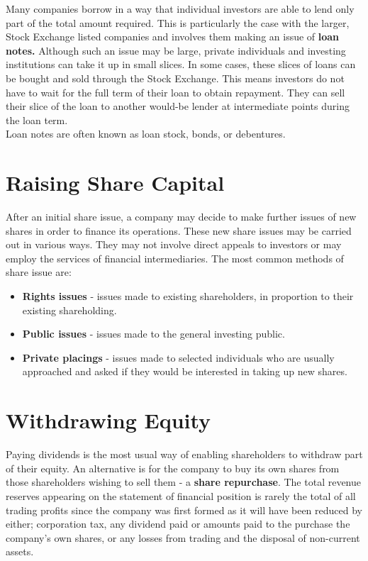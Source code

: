 \documentclass{report}
\begin{document}
Many companies borrow in a way that individual investors are able to lend only part of the total amount required. This is particularly the case with the larger, Stock Exchange listed companies and involves them making an issue of \textbf{loan notes.} Although such an issue may be large, private individuals and investing institutions can take it up in small slices. In some cases, these slices of loans can be bought and sold through the Stock Exchange. This means investors do not have to wait for the full term of their loan to obtain repayment. They can sell their slice of the loan to another would-be lender at intermediate points during the loan term.\\

Loan notes are often known as loan stock, bonds, or debentures.

\section{Raising Share Capital}

After an initial share issue, a company may decide to make further issues of new shares in order to finance its operations. These new share issues may be carried out in various ways. They may not involve direct appeals to investors or may employ the services of financial intermediaries. The most common methods of share issue are:
\begin{itemize}
    \item \textbf{Rights issues} - issues made to existing shareholders, in proportion to their existing shareholding.
    \item \textbf{Public issues} - issues made to the general investing public.
    \item \textbf{Private placings} - issues made to selected individuals who are usually approached and asked if they would be interested in taking up new shares.
\end{itemize}

\section{Withdrawing Equity}

Paying dividends is the most usual way of enabling shareholders to withdraw part of their equity. An alternative is for the company to buy its own shares from those shareholders wishing to sell them - a \textbf{share repurchase}. The total revenue reserves appearing on the statement of financial position is rarely the total of all trading profits since the company was first formed as it will have been reduced by either; corporation tax, any dividend paid or amounts paid to the purchase the company's own shares, or any losses from trading and the disposal of non-current assets.\\
\end{document}
